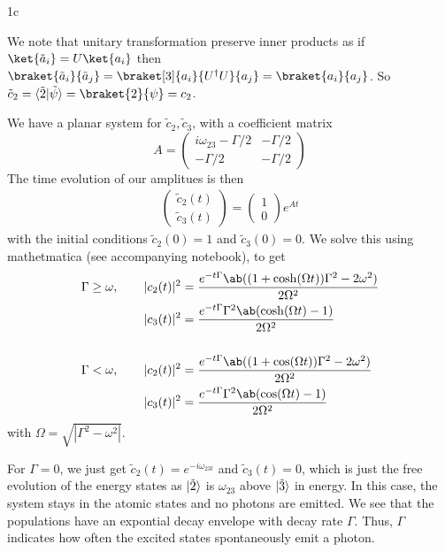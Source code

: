\documentclass[12pt]{article}
\begin{document}
\begin{exc}{1c}

\end{exc}
\begin{ans}
 We note that unitary transformation preserve inner products as if $\ket{\tilde a_i} = U \ket{a_i}$ then $\braket{\tilde a_i}{\tilde a_j} = \braket[3]{a_i}{U^\dagger U}{a_j} = \braket{a_i}{a_j}$. So $\tilde c_2 = \ubraket{\tilde 2}{\tilde \psi} = \braket{2}{\psi} = c_2$. 

 We have a planar system for $\tilde c_2, \tilde c_3$, with a coefficient matrix 
 \[A = \begin{pmatrix}
    i\omega_{23} - \Gamma/2 & -\Gamma/2 \\ 
     -\Gamma/2  &  -\Gamma/2 
 \end{pmatrix}\]
 The time evolution of our amplitues is then 
 \begin{align*}
    \begin{pmatrix}
    \tilde c_2(t) \\ \tilde c_3(t)
    \end{pmatrix} = \begin{pmatrix}
        1 \\ 0
    \end{pmatrix}e^{At}
 \end{align*}
 with the initial conditions $\tilde c_2(0) = 1$ and $\tilde c_3(0) = 0$. We solve this using mathetmatica (see accompanying notebook), to get 
  \begin{align*}
    \Gamma \geq \omega, \qquad |c_2(t)|^2 &= \frac{e^{-t\Gamma}\ab((1 + \cosh(\Omega  t))\Gamma^2 - 2\omega^2)}{2\Omega^2}\\
    |c_3(t)|^2 &= \frac{e^{-t\Gamma}\Gamma^2\ab(\cosh(\Omega t) - 1)}{2\Omega^2} \\[1.5em]
    \Gamma < \omega ,\qquad|c_2(t)|^2 &= \frac{e^{-t\Gamma}\ab((1 + \cos(\Omega t))\Gamma^2 - 2\omega^2)}{2\Omega^2} \\ 
    |c_3(t)|^2 &= \frac{e^{-t\Gamma}\Gamma^2\ab(\cos(\Omega t) - 1)}{2\Omega^2} 
 \end{align*}
 with $\Omega = \sqrt{|\Gamma^2 - \omega^2|}$.

For $\Gamma = 0$, we just get $\tilde c_2(t) = e^{-i\omega_{23t}}$ and $\tilde c_3(t) = 0$, which is just the free evolution of the energy states as $\vert \tilde 2 \rangle$ is $\omega_{23}$ above $\vert \tilde 3 \rangle$ in energy. In this case, the system stays in the atomic states and no photons are emitted. We see that the populations have an expontial decay envelope with decay rate $\Gamma$. Thus, $\Gamma$ indicates how often the excited states spontaneously emit a photon.
\end{ans}
\end{document}

